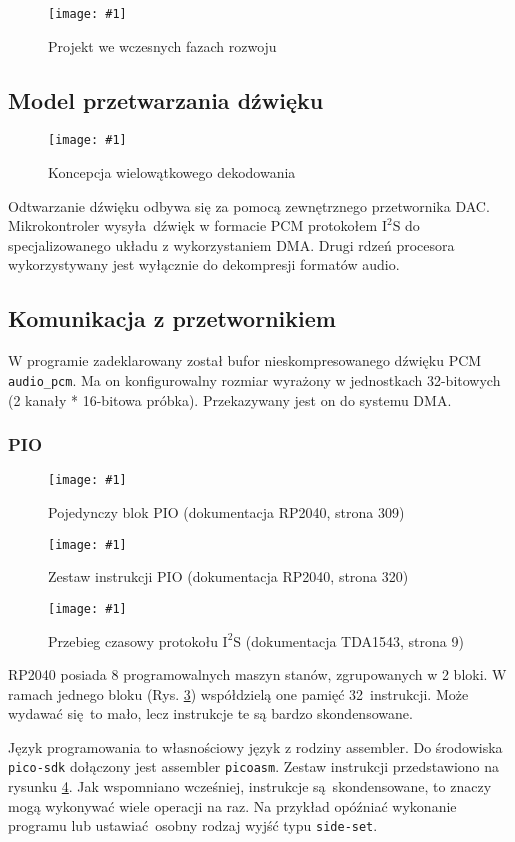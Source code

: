 \documentclass[12pt]{report}
\newcommand{\imgint}[4]{
	\begin{figure}[{#4}]
		\centering
		\texttt{[image: \#1]}
		\caption{#2}
		\label{#1}
	\end{figure}
}
\newcommand{\imgcs}[3]{\imgint{#1}{#2}{#3}{}}
\newcommand{\isqs}{$\text{I}^{2}\text{S}$}
\newcommand{\sset}{\lstinline|side-set|}
\begin{document}
	\imgcs{3/pr_wav}{Projekt we wczesnych fazach rozwoju}{0.45}
	
	\subsection{Model przetwarzania dźwięku}
	
	\imgcs{3/pipeline}{Koncepcja wielowątkowego dekodowania}{0.8}
	
	Odtwarzanie dźwięku odbywa się za pomocą zewnętrznego przetwornika DAC. Mikrokontroler wysyła dźwięk w formacie PCM protokołem \isqs{} do specjalizowanego układu z wykorzystaniem DMA. Drugi rdzeń procesora wykorzystywany jest wyłącznie do dekompresji formatów audio.
	
	
	\subsection{Komunikacja z przetwornikiem}
	W programie zadeklarowany został bufor nieskompresowanego dźwięku PCM \lstinline|audio_pcm|. Ma on konfigurowalny rozmiar wyrażony w jednostkach 32-bitowych (2 kanały * 16-bitowa próbka). Przekazywany jest on do systemu DMA.
	
	\subsubsection{PIO}
		\imgcs{3/pio_block}{Pojedynczy blok PIO (dokumentacja RP2040\textsuperscript{\cite{pico_pdf}}, strona 309)}{0.7}
		\imgcs{3/pio_instr}{Zestaw instrukcji PIO (dokumentacja RP2040, strona 320)}{0.7}
		\imgcs{3/pio_i2s_docs}{Przebieg czasowy protokołu \isqs{} (dokumentacja TDA1543\textsuperscript{\cite{tda_pdf}}, strona 9)}{0.9}
		
		RP2040 posiada 8 programowalnych maszyn stanów, zgrupowanych w 2 bloki. W ramach jednego bloku (Rys. \ref{3/pio_block}) współdzielą one pamięć 32 instrukcji. Może wydawać się to mało, lecz instrukcje te są bardzo skondensowane.
		
		Język programowania to własnościowy język z rodziny assembler. Do środowiska \lstinline|pico-sdk| dołączony jest assembler \lstinline|picoasm|. Zestaw instrukcji przedstawiono na rysunku \ref{3/pio_instr}. Jak wspomniano wcześniej, instrukcje są skondensowane, to znaczy mogą wykonywać wiele operacji na raz. Na przykład opóźniać wykonanie programu lub ustawiać osobny rodzaj wyjść typu \sset{}.
		
\end{document}
